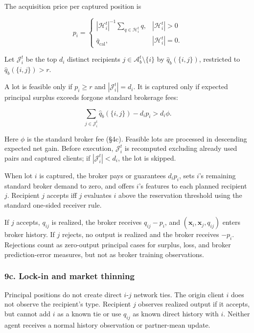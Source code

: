 \documentclass[11pt]{article}
\begin{document}
The acquisition price per captured position is

\[
p_i = \begin{cases}
|\mathcal{H}_i^t|^{-1}\sum_{q \in \mathcal{H}_i^t} q, & |\mathcal{H}_i^t| > 0 \\
\bar{q}_{\text{cal}}, & |\mathcal{H}_i^t| = 0 .
\end{cases}
\]

Let \(\mathcal{J}_i^t\) be the top \(d_i\) distinct recipients \(j \in \mathcal{A}_b^t \setminus \{i\}\) by \(\hat{q}_b(\{i,j\})\), restricted to \(\hat{q}_b(\{i,j\}) > r\).

A lot is feasible only if \(p_i \geq r\) and \(|\mathcal{J}_i^t| = d_i\). It is captured only if expected principal surplus exceeds forgone standard brokerage fees:

\[
\sum_{j \in \mathcal{J}_i^t} \hat{q}_b(\{i,j\}) - d_i p_i > d_i \phi.
\]

Here \(\phi\) is the standard broker fee (§4c). Feasible lots are processed in descending expected net gain. Before execution, \(\mathcal{J}_i^t\) is recomputed excluding already used pairs and captured clients; if \(|\mathcal{J}_i^t| < d_i\), the lot is skipped.

When lot \(i\) is captured, the broker pays or guarantees \(d_i p_i\), sets \(i\)'s remaining standard broker demand to zero, and offers \(i\)'s features to each planned recipient \(j\). Recipient \(j\) accepts iff \(j\) evaluates \(i\) above the reservation threshold using the standard one-sided receiver rule.

If \(j\) accepts, \(q_{ij}\) is realized, the broker receives \(q_{ij} - p_i\), and \((\mathbf{x}_i,\mathbf{x}_j,q_{ij})\) enters broker history. If \(j\) rejects, no output is realized and the broker receives \(-p_i\). Rejections count as zero-output principal cases for surplus, loss, and broker prediction-error measures, but not as broker training observations.

\subsubsection{9c. Lock-in and market thinning}\label{c.-lock-in-and-market-thinning}

Principal positions do not create direct \(i\)-\(j\) network ties. The origin client \(i\) does not observe the recipient's type. Recipient \(j\) observes realized output if it accepts, but cannot add \(i\) as a known tie or use \(q_{ij}\) as known direct history with \(i\). Neither agent receives a normal history observation or partner-mean update.
\end{document}
